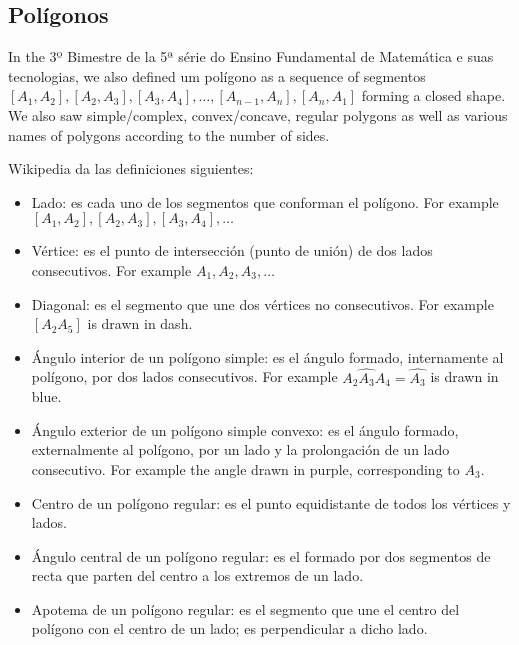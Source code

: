 \subsection{Polígonos}

In the 3º Bimestre de la
5ª série do Ensino Fundamental de Matemática e suas tecnologias,
we also defined um polígono as a sequence of segmentos
${[A_1,A_2]}, {[A_2, A_3]}, {[A_3, A_4]},\ldots,
{[A_{n-1},A_n]}, {[A_{n},A_1]}$ forming a closed shape. We also saw
simple/complex, convex/concave, regular polygons as well as various names of
polygons according to the number of sides.

\begin{center}
\end{center}

Wikipedia da las definiciones siguientes:

\begin{itemize}
\item Lado: es cada uno de los segmentos que conforman el polígono.
  For example ${[A_1,A_2]}, {[A_2, A_3]}, {[A_3, A_4]},\ldots$
\item Vértice: es el punto de intersección (punto de unión) de dos lados consecutivos. For example $A_1, A_2, A_3, \ldots$
\item Diagonal: es el segmento que une dos vértices no consecutivos.
  For example $[A_2A_5]$ is drawn in dash.
\item Ángulo interior de un polígono simple: es el ángulo formado, internamente al polígono, por dos lados consecutivos.
  For example
  $\widehat{A_2A_3A_4} = \widehat{A_3}$ is drawn in blue.
\item Ángulo exterior de un polígono simple convexo: es el ángulo formado,
  externalmente al polígono,
  por un lado y la prolongación de un lado consecutivo.
  For example the angle drawn in purple, corresponding to $A_3$.
\item Centro de un polígono regular: es el punto equidistante de todos los vértices y lados.
\item Ángulo central de un polígono regular:
  es el formado por dos segmentos de recta que parten del centro a los extremos
  de un lado.
\item Apotema de un polígono regular: es el segmento que une el centro del polígono con el centro de un lado; es perpendicular a dicho lado.
\end{itemize}

